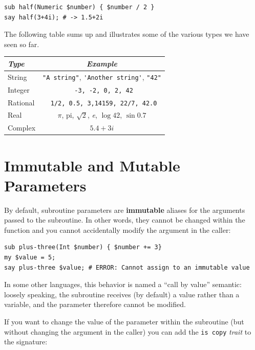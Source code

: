 \begin{verbatim}
sub half(Numeric $number) { $number / 2 }
say half(3+4i); # -> 1.5+2i
\end{verbatim}

The following table sums up and illustrates some of the 
various types we have seen so far.

\begin{center}
\begin{tabular}{|l|c|}  \hline
\label{types}
\emph{Type} & \emph{Example}   \\ \hline
String      & \verb'"A string"', \verb"'Another string'", \verb'"42"' \\ \hline
Integer     & \verb' -3, -2, 0, 2, 42' \\ \hline
Rational    & \verb' 1/2, 0.5, 3,14159, 22/7, 42.0' \\ \hline
Real        & $\pi$, pi, $\surd{2}$, \emph{e}, $\log 42$, $\sin 0.7$\\ \hline
Complex     & $5.4 + 3i$ \\ \hline
\end{tabular}
\end{center}


\section{Immutable and Mutable Parameters}

By default, subroutine parameters are {\bf immutable} aliases for 
the arguments passed to the subroutine. In other words, they 
cannot be changed within the function and you cannot 
accidentally modify the argument in the caller:

\begin{verbatim}
sub plus-three(Int $number) { $number += 3}
my $value = 5;
say plus-three $value; # ERROR: Cannot assign to an immutable value
\end{verbatim}

In some other languages, this behavior is named a ``call 
by value'' semantic: loosely speaking, the subroutine 
receives (by default) a value rather than a variable, and 
the parameter therefore cannot be modified.

If you want to change the value of the parameter within the 
subroutine (but without changing the argument in the caller) 
you can add the {\tt is copy} \emph{trait} to the signature:

